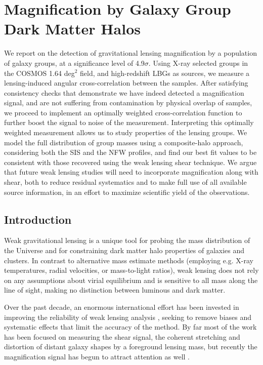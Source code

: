 
\chapter{Magnification by Galaxy Group Dark Matter Halos}
\label{ch2}

We report on the detection of gravitational lensing magnification by a population of galaxy groups, at a significance level of 4.9$\sigma$.  Using X-ray selected groups in the \acf{COSMOS} 1.64 deg$^2$ field, and high-redshift \ac{LBG}s as sources, we measure a lensing-induced angular cross-correlation between the samples.  After satisfying consistency checks that demonstrate we have indeed detected a magnification signal, and are not suffering from contamination by physical overlap of samples, we proceed to implement an optimally weighted cross-correlation function to further boost the signal to noise of the measurement. Interpreting this optimally weighted measurement allows us to study properties of the lensing groups. We model the full distribution of group masses using a composite-halo approach, considering both the \acf{SIS} and the \acf{NFW} profiles, and find our best fit values to be consistent with those recovered using the weak lensing shear technique.  We argue that future weak lensing studies will need to incorporate magnification along with shear, both to reduce residual systematics and to make full use of all available source information, in an effort to maximize scientific yield of the observations.


\section{Introduction}
Weak gravitational lensing is a unique tool for probing the mass distribution of the Universe and for constraining dark matter halo properties of galaxies and clusters. In contrast to alternative mass estimate methods (employing e.g. X-ray temperatures, radial velocities, or mass-to-light ratios), weak lensing does not rely on any assumptions about virial equilibrium and is sensitive to all mass along the line of sight, making no distinction between luminous and dark matter.

Over the past decade, an enormous international effort has been invested in improving the reliability of weak lensing analysis \citep{step1, step2, great08, great10}, seeking to remove biases and systematic effects that limit the accuracy of the method. By far most of the work has been focused on measuring the shear signal, the coherent stretching and distortion of distant galaxy shapes by a foreground lensing mass, but recently the magnification signal has begun to attract attention as well \citep{Scranton05, Hildebrandt09b, Hildebrandt11, LHJM10, Umetsu11, Huff14}.  

